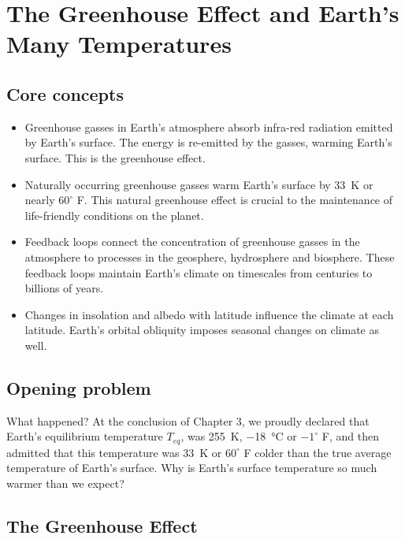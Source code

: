 \chapter{The Greenhouse Effect and Earth's Many Temperatures}\label{chap:GHE}

\section{Core concepts}
\begin{itemize}
\item Greenhouse gasses in Earth's atmosphere absorb infra-red radiation emitted by Earth's surface. The energy is re-emitted by the gasses, warming Earth's surface. This is the greenhouse effect.
\item Naturally occurring greenhouse gasses warm Earth's surface by \SI{33}{\kelvin} or nearly ${60}^{\circ}$ F. This natural greenhouse effect is crucial to the maintenance of life-friendly conditions on the planet.
\item Feedback loops connect the concentration of greenhouse gasses in the atmosphere to processes in the geosphere, hydrosphere and biosphere. These feedback loops maintain Earth's climate on timescales from centuries to billions of years.
\item Changes in insolation and albedo with latitude influence the climate at each latitude. Earth's orbital obliquity imposes seasonal changes on climate as well. 
\end{itemize}

\section{Opening problem}
What happened? At the conclusion of Chapter 3, we proudly declared that Earth's equilibrium temperature $T_{eq}$, was \SI{255}{\kelvin}, \SI{-18}{\celsius} or ${-1}^{\circ}$ F, and then admitted that this temperature was \SI{33}{\kelvin} or ${60}^{\circ}$ F colder than the true average temperature of Earth's surface. Why is Earth's surface temperature so much warmer than we expect?

\section{The Greenhouse Effect}
